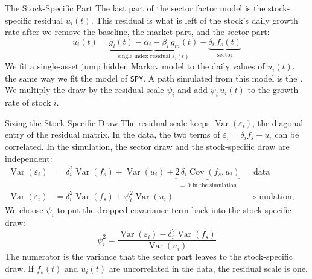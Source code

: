 \documentclass[aspectratio=169,11pt]{beamer}
\begin{document}
\begin{frame}{The Stock-Specific Part}
  The last part of the sector factor model is the stock-specific residual $u_i(t)$. This residual is
  what is left of the stock's daily growth rate after we remove the baseline, the market part, and
  the sector part:
  \begin{equation*}
    u_{i}(t)=\underbrace{g_{i}(t)-\alpha_{i}-\beta_{i}\,g_{m}(t)}_{\textstyle\text{single index residual }\varepsilon_{i}(t)}-\underbrace{\delta_{i}\,f_{s}(t)}_{\textstyle\text{sector}}
  \end{equation*}
  We fit a single-asset jump hidden Markov model to the daily values of $u_i(t)$, the same way we
  fit the model of \texttt{SPY}. A path simulated from this model is the . We multiply the draw by the residual scale $\psi_i$ and add $\psi_i\,u_i(t)$ to the growth
  rate of stock $i$.
\end{frame}

\begin{frame}{Sizing the Stock-Specific Draw}
  The residual scale keeps $\operatorname{Var}(\varepsilon_i)$, the diagonal entry of the residual
  matrix. In the data, the two terms of $\varepsilon_i=\delta_i f_s+u_i$ can be correlated. In the
  simulation, the sector draw and the stock-specific draw are independent:
  \begin{align*}
    \operatorname{Var}(\varepsilon_{i}) &= \delta_{i}^{2}\operatorname{Var}(f_{s})+\operatorname{Var}(u_{i})+\underbrace{2\,\delta_{i}\operatorname{Cov}(f_{s},u_{i})}_{=\,0\text{ in the simulation}} && \text{data}\\
    \operatorname{Var}(\varepsilon_{i}) &= \delta_{i}^{2}\operatorname{Var}(f_{s})+\psi_{i}^{2}\operatorname{Var}(u_{i}) && \text{simulation, independent draws}
  \end{align*}
  We choose $\psi_i$ to put the dropped covariance term back into the stock-specific draw:
  \begin{equation*}
    \boxed{\psi_i^2=\frac{\operatorname{Var}(\varepsilon_i)-\delta_i^2\operatorname{Var}(f_s)}{\operatorname{Var}(u_i)}}
  \end{equation*}
  The numerator is the variance that the sector part leaves to the stock-specific draw. If $f_s(t)$
  and $u_i(t)$ are uncorrelated in the data, the residual scale is one.
\end{frame}
\end{document}
